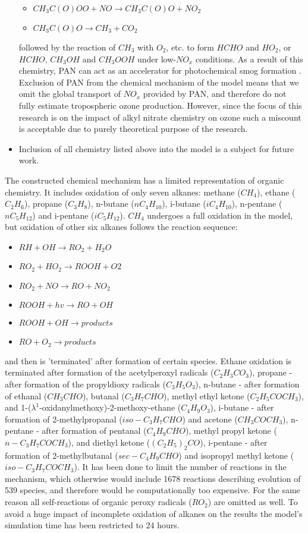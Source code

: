 \documentclass[11pt,a4paper]{article}
\begin{document}
\begin{itemize}
\begin{itemize}
\item[] $CH_3C(O)OO + NO \rightarrow CH_3C(O)O + NO_2$
\item[] $CH_3C(O)O \rightarrow CH_3 + CO_2$
\end{itemize}
followed by the reaction of $CH_3$ with $O_2$, etc. to form $HCHO$ and $HO_2$, or $HCHO$, $CH_3OH$ and $CH_3OOH$ under low-$NO_x$ conditions. As a result of this chemistry, PAN can act as an accelerator for photochemical smog formation \citep{Finlayson-Pitts2000}. Exclusion of PAN from the chemical mechanism of the model means that we omit the global transport of $NO_x$ provided by PAN, and therefore do not fully estimate tropospheric ozone production. However, since the focus of this research is on the impact of alkyl nitrate chemistry on ozone such a miscount is acceptable due to purely theoretical purpose of the research.
\item Inclusion of all chemistry listed above into the model is a subject for future work.
\end{itemize}

The constructed chemical mechanism has a limited representation of organic chemistry. It includes oxidation of only seven alkanes: methane ($CH_4$), ethane ($C_2H_6$), propane ($C_3H_8$), n-butane ($nC_4H_{10}$), i-butane ($iC_4H_{10}$), n-pentane ($nC_5H_{12}$) and i-pentane ($iC_5H_{12}$). $CH_4$ undergoes a full oxidation in the model, but oxidation of other six alkanes follows the reaction sequence:
\begin{itemize}
\item[] $RH + OH \rightarrow RO_2 + H_2O$
\item[] $RO_2 + HO_2 \rightarrow ROOH + O2$
\item[] $RO_2 + NO \rightarrow RO + NO_2$
\item[] $ROOH + hv \rightarrow RO + OH$
\item[] $ROOH + OH \rightarrow products$
\item[] $RO + O_2 \rightarrow products$
\end{itemize}
and then is 'terminated' after formation of certain species. Ethane oxidation is terminated after formation of the acetylperoxyl radicals ($C_2H_3CO_3$), propane - after formation of the propyldioxy radicals ($C_3H_5O_3$), n-butane - after formation of ethanal ($CH_3CHO$), butanal ($C_3H_7CHO$), methyl ethyl ketone ($C_2H_5COCH_3$), and 1-($\lambda^1$-oxidanylmethoxy)-2-methoxy-ethane ($C_4H_9O_3$), i-butane - after formation of 2-methylpropanal ($iso-C_3H_7CHO$) and acetone ($CH_3COCH_3$), n-pentane - after formation of pentanal ($C_4H_9CHO$), methyl propyl ketone ($n-C_3H_7COCH_3$), and diethyl ketone ($(C_2H_5)_2CO$), i-pentane - after formation of 2-methylbutanal ($sec-C_4H_9CHO$) and isopropyl methyl ketone ($iso-C_3H_7COCH_3$). It has been done to limit the number of reactions in the mechanism, which otherwise would include 1678 reactions describing evolution of 539 species, and therefore would be computationally too expensive. For the same reason all self-reactions of organic peroxy radicals ($RO_2$) are omitted as well. To avoid a huge impact of incomplete oxidation of alkanes on the results the model's simulation time has been restricted to 24 hours.
\end{document}

